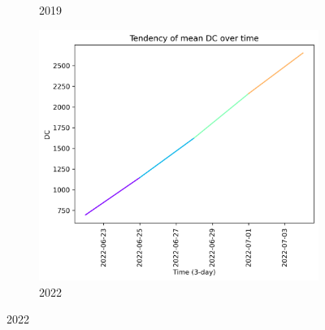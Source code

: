 \begin{figure}[h]
\begin{subfigure}{0.3\textwidth}
        \caption{2019}
        \label{fig:dc_prior_15_days_2019}
    \end{subfigure}
    \hfill
    \begin{subfigure}{0.3\textwidth}
        \centering
        \includegraphics[width=\textwidth]{graphs/2022/tendency/2022_tendency_graph_DC.png}
        \caption{2022}
        \label{fig:dc_prior_15_days_2022}
    \end{subfigure}
    
    \label{fig:dc_values_15days_prior}
\end{figure}

